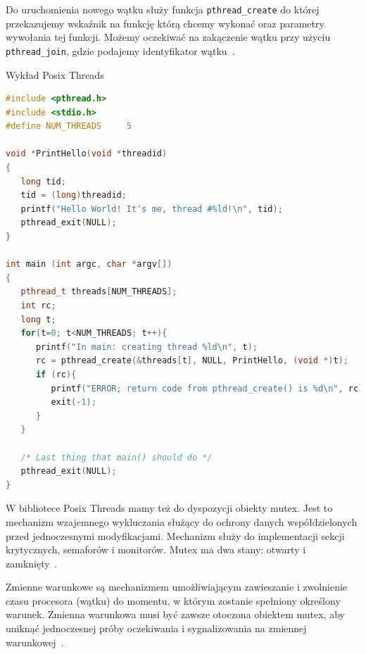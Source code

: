 \documentclass[wi]{zut}
\begin{document}
Do uruchomienia nowego wątku służy funkcja \lstinline{pthread_create} do której przekazujemy wskaźnik na funkcję którą chcemy wykonać oraz parametry wywołania tej funkcji. Możemy oczekiwać na zakączenie wątku przy użyciu \lstinline{pthread_join}, gdzie podajemy identyfikator wątku~\cite{Palkowski_POSIX}.

{Wykład Posix Threads \cite{Palkowski_POSIX}}{\label{kod:przyklad}}
\begin{lstlisting}[language=C++]
#include <pthread.h>
#include <stdio.h>
#define NUM_THREADS     5

void *PrintHello(void *threadid)
{
   long tid;
   tid = (long)threadid;
   printf("Hello World! It's me, thread #%ld!\n", tid);
   pthread_exit(NULL);
}

int main (int argc, char *argv[])
{
   pthread_t threads[NUM_THREADS];
   int rc;
   long t;
   for(t=0; t<NUM_THREADS; t++){
      printf("In main: creating thread %ld\n", t);
      rc = pthread_create(&threads[t], NULL, PrintHello, (void *)t);
      if (rc){
         printf("ERROR; return code from pthread_create() is %d\n", rc);
         exit(-1);
      }
   }

   /* Last thing that main() should do */
   pthread_exit(NULL);
}
\end{lstlisting}

W bibliotece Posix Threads mamy też do dyspozycji obiekty mutex. Jest to mechanizm wzajemnego wykluczania służący do ochrony danych współdzielonych przed jednoczesnymi modyfikacjami. Mechanizm służy do implementacji sekcji krytycznych, semaforów i monitorów. Mutex ma dwa stany: otwarty i zamknięty~\cite{Palkowski_POSIX}.

Zmienne warunkowe są mechanizmem umożliwiającym zawieszanie i zwolnienie czasu procesora (wątku) do momentu, w którym zostanie spełniony określony warunek. Zmienna warunkowa musi być zawsze otoczona obiektem mutex, aby uniknąć jednoczesnej próby oczekiwania i sygnalizowania na zmiennej warunkowej~\cite{Palkowski_POSIX}.
\end{document}
